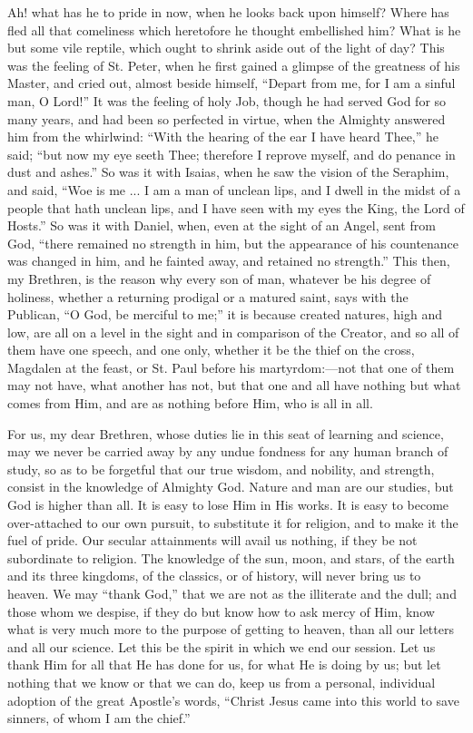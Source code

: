 Ah! what has he to pride in now, when he looks back
upon himself? Where has fled all that comeliness which
heretofore he thought embellished him? What is he but
some vile reptile, which ought to shrink aside out of the
light of day? This was the feeling of St. Peter, when he
first gained a glimpse of the greatness of his Master,
and cried out, almost beside himself, ``Depart from
me, for I am a sinful man, O Lord!'' It was the
feeling of holy Job, though he had served God for so many
years, and had been so perfected in virtue, when the
Almighty answered him from the whirlwind: ``With the
hearing of the ear I have heard Thee,'' he said;
``but now my eye seeth Thee; therefore I reprove
myself, and do penance in dust and ashes.'' So was it
with Isaias, when he saw the vision of the Seraphim, and
said, ``Woe is me ... I am a man of unclean lips, and
I dwell in the midst of a people that hath unclean lips,
and I have seen with my eyes the King, the Lord of
Hosts.'' So was it with Daniel, when, even at the
sight of an Angel, sent from God, ``there remained no
strength in him, but the appearance of his countenance
was changed in him, and he fainted away, and retained no
strength.'' This then, my Brethren, is the reason why
every son of man, whatever be his degree of holiness,
whether a returning prodigal or a matured saint, says
with the Publican, ``O God, be merciful to me;''
it is because created natures, high and low, are all on a
level in the sight and in comparison of the Creator, and
so all of them have one speech, and one only, whether it
be the thief on the cross, Magdalen at the feast, or St.
Paul before his martyrdom:—not that one of them may
not have, what another has not, but that one and all have
nothing but what comes from Him, and are as nothing
before Him, who is all in all.

For us, my dear Brethren, whose duties lie in this
seat of learning and science, may we never be carried
away by any undue fondness for any human branch of study,
so as to be forgetful that our true wisdom, and nobility,
and strength, consist in the knowledge of Almighty God.
Nature and man are our studies, but God is higher than
all. It is easy to lose Him in His works. It is easy to
become over-attached to our own pursuit, to substitute it
for religion, and to make it the fuel of pride. Our
secular attainments will avail us nothing, if they be not
subordinate to religion. The knowledge of the sun, moon,
and stars, of the earth and its three kingdoms, of the
classics, or of history, will never bring us to heaven.
We may ``thank God,'' that we are not as the
illiterate and the dull; and those whom we despise, if
they do but know how to ask mercy of Him, know what is
very much more to the purpose of getting to heaven, than
all our letters and all our science. Let this be the
spirit in which we end our session. Let us thank Him for
all that He has done for us, for what He is doing by us;
but let nothing that we know or that we can do, keep us
from a personal, individual adoption of the great
Apostle's words, ``Christ Jesus came into this world
to save sinners, of whom I am the chief.''

